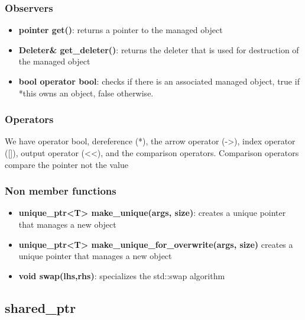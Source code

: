 \documentclass{report}
\begin{document}
        \bigbreak \noindent 
        \subsubsection{Observers}
        \begin{itemize}
            \item \textbf{pointer get()}: returns a pointer to the managed object
            \item \textbf{Deleter\& get\_deleter()}: returns the deleter that is used for destruction of the managed object
            \item \textbf{bool operator bool}: checks if there is an associated managed object, true if *this owns an object, false otherwise.
        \end{itemize}

        \bigbreak \noindent 
        \subsubsection{Operators}
        \bigbreak \noindent 
        We have operator bool, dereference (*), the arrow operator (->), index operator ([]), output operator (<<), and the comparison operators. Comparison operators compare the pointer not the value 

        \bigbreak \noindent 
        \subsubsection{Non member functions}
        \begin{itemize}
            \item \textbf{unique\_ptr<T> make\_unique(args, size)}: creates a unique pointer that manages a new object
            \item \textbf{unique\_ptr<T> make\_unique\_for\_overwrite(args, size)} creates a unique pointer that manages a new object
            \item \textbf{void swap(lhs,rhs)}: specializes the std::swap algorithm
        \end{itemize}

        \pagebreak 
        \subsection{shared\_ptr}
        \bigbreak \noindent 
\end{document}
